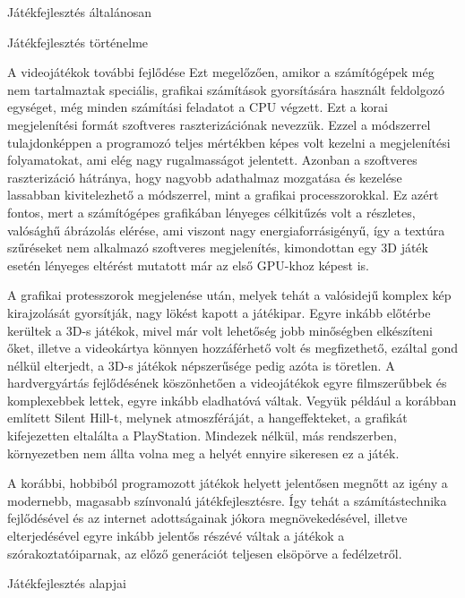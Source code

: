 \begin{MyChapter}{Játékfejlesztés általánosan}
\begin{MySection}{Játékfejlesztés történelme}
\begin{MySubSection}{A videojátékok további fejlődése}
		Ezt megelőzően, amikor a számítógépek még nem tartalmaztak speciális, grafikai számítások gyorsítására használt feldolgozó egységet, még minden számítási feladatot a CPU végzett. Ezt a korai megjelenítési formát szoftveres raszterizációnak nevezzük. Ezzel a módszerrel tulajdonképpen a programozó teljes mértékben képes volt kezelni a megjelenítési folyamatokat, ami elég nagy rugalmasságot jelentett.
		Azonban a szoftveres raszterizáció hátránya, hogy nagyobb adathalmaz mozgatása és kezelése lassabban kivitelezhető a módszerrel, mint a grafikai processzorokkal.
		Ez azért fontos, mert a számítógépes grafikában lényeges célkitűzés volt a részletes, valósághű ábrázolás elérése, ami viszont nagy energiaforrásigényű, így a textúra szűréseket nem alkalmazó szoftveres megjelenítés, kimondottan egy 3D játék esetén lényeges eltérést mutatott már az első GPU-khoz képest is.
		
		A grafikai protesszorok megjelenése után, melyek tehát a valósidejű komplex kép kirajzolását gyorsítják, nagy lökést kapott a játékipar. Egyre inkább előtérbe kerültek a 3D-s játékok, mivel már volt lehetőség jobb minőségben elkészíteni őket, illetve a videokártya könnyen hozzáférhető volt és megfizethető, ezáltal gond nélkül elterjedt, a 3D-s játékok népszerűsége pedig azóta is töretlen.
		A hardvergyártás fejlődésének köszönhetően a videojátékok egyre filmszerűbbek és komplexebbek lettek, egyre inkább eladhatóvá váltak. Vegyük például a korábban említett Silent Hill-t, melynek atmoszféráját, a hangeffekteket, a grafikát kifejezetten eltalálta a PlayStation. Mindezek nélkül, más rendszerben, környezetben nem állta volna meg a helyét ennyire sikeresen ez a játék.
		
		A korábbi, hobbiból programozott játékok helyett jelentősen megnőtt az igény a modernebb, magasabb színvonalú játékfejlesztésre. 
		Így tehát a számítástechnika fejlődésével és az internet adottságainak jókora megnövekedésével, illetve elterjedésével egyre inkább jelentős részévé váltak a játékok a szórakoztatóiparnak, az előző generációt teljesen elsöpörve a fedélzetről.
		\end{MySubSection}
				
	\end{MySection}

	\begin{MySection}{Játékfejlesztés alapjai} 
		

\end{MySection}
\end{MyChapter}

